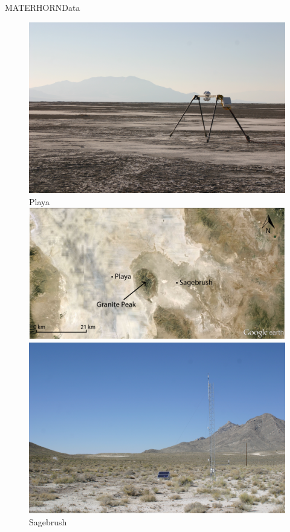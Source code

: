 \documentclass{beamer}
\begin{document}
\begin{frame}{MATERHORN}{Data}
	\begin{figure}
	\centering
		\includegraphics[width=\linewidth]{pictures/IMG_5488}
		\\ Playa
	\endminipage\hfill
	\centering
		\includegraphics[width=\linewidth]{pictures/sitemap}
		\\ \tiny{\textit{\cite{jensen2016observations}}}
	\endminipage\hfill
	\centering
		\includegraphics[width=\linewidth]{pictures/IMG_5440}
		\\ Sagebrush
	\endminipage\hfill
	\end{figure}
\end{frame}
\end{document}
